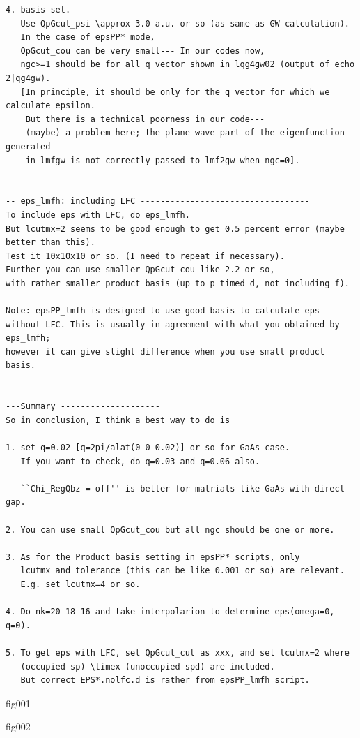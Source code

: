 \documentclass[a4paper,10pt,epsf,fleqn]{article}
\newcommand{\figp}[1]{\rotatebox{-90}{\texttt{[image: \#1]}}}
\begin{document}
{{{\begin{verbatim}
4. basis set.
   Use QpGcut_psi \approx 3.0 a.u. or so (as same as GW calculation).
   In the case of epsPP* mode, 
   QpGcut_cou can be very small--- In our codes now, 
   ngc>=1 should be for all q vector shown in lqg4gw02 (output of echo 2|qg4gw).
   [In principle, it should be only for the q vector for which we calculate epsilon.
    But there is a technical poorness in our code---
    (maybe) a problem here; the plane-wave part of the eigenfunction generated 
    in lmfgw is not correctly passed to lmf2gw when ngc=0].


-- eps_lmfh: including LFC ----------------------------------
To include eps with LFC, do eps_lmfh. 
But lcutmx=2 seems to be good enough to get 0.5 percent error (maybe better than this).
Test it 10x10x10 or so. (I need to repeat if necessary).
Further you can use smaller QpGcut_cou like 2.2 or so, 
with rather smaller product basis (up to p timed d, not including f).

Note: epsPP_lmfh is designed to use good basis to calculate eps 
without LFC. This is usually in agreement with what you obtained by eps_lmfh;
however it can give slight difference when you use small product basis.


---Summary --------------------
So in conclusion, I think a best way to do is

1. set q=0.02 [q=2pi/alat(0 0 0.02)] or so for GaAs case.
   If you want to check, do q=0.03 and q=0.06 also.

   ``Chi_RegQbz = off'' is better for matrials like GaAs with direct gap.

2. You can use small QpGcut_cou but all ngc should be one or more.

3. As for the Product basis setting in epsPP* scripts, only
   lcutmx and tolerance (this can be like 0.001 or so) are relevant.
   E.g. set lcutmx=4 or so.

4. Do nk=20 18 16 and take interpolarion to determine eps(omega=0, q=0).

5. To get eps with LFC, set QpGcut_cut as xxx, and set lcutmx=2 where
   (occupied sp) \timex (unoccupied spd) are included.
   But correct EPS*.nolfc.d is rather from epsPP_lmfh script.

\end{verbatim}


\figp{gas_fig001.eps}

fig001

\figp{gas_fig002.eps}

fig002

\figp{gas_fig003.eps}

}}}
\end{document}
